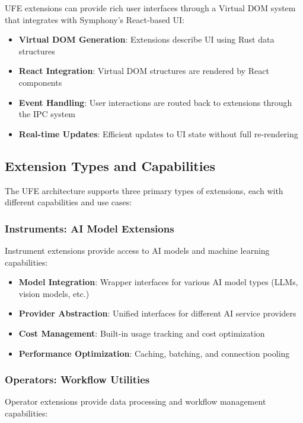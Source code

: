 UFE extensions can provide rich user interfaces through a Virtual DOM system that integrates with Symphony's React-based UI:

\begin{itemize}
    \item \textbf{Virtual DOM Generation}: Extensions describe UI using Rust data structures
    \item \textbf{React Integration}: Virtual DOM structures are rendered by React components
    \item \textbf{Event Handling}: User interactions are routed back to extensions through the IPC system
    \item \textbf{Real-time Updates}: Efficient updates to UI state without full re-rendering
\end{itemize}

\subsection{Extension Types and Capabilities}

The UFE architecture supports three primary types of extensions, each with different capabilities and use cases:

\subsubsection{Instruments: AI Model Extensions}

Instrument extensions provide access to AI models and machine learning capabilities:

\begin{itemize}
    \item \textbf{Model Integration}: Wrapper interfaces for various AI model types (LLMs, vision models, etc.)
    \item \textbf{Provider Abstraction}: Unified interfaces for different AI service providers
    \item \textbf{Cost Management}: Built-in usage tracking and cost optimization
    \item \textbf{Performance Optimization}: Caching, batching, and connection pooling
\end{itemize}

\subsubsection{Operators: Workflow Utilities}

Operator extensions provide data processing and workflow management capabilities:

